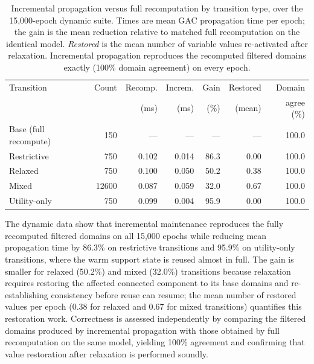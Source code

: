 \documentclass[pdflatex,sn-mathphys-num,iicol,oneside]{sn-jnl}
\begin{document}
\begin{table}[t]
\centering
\caption{Incremental propagation versus full recomputation by
transition type, over the 15{,}000-epoch dynamic suite. Times are mean
GAC propagation time per epoch; the gain is the mean reduction relative
to matched full recomputation on the identical model. \emph{Restored}
is the mean number of variable values re-activated after relaxation.
Incremental propagation reproduces the recomputed filtered domains
exactly (100\% domain agreement) on every epoch.}
\label{tab:incremental-results}
\setlength{\tabcolsep}{4pt}\small
\begin{tabular}{lrrrrrr}
\toprule
Transition & Count & Recomp. & Increm. & Gain & Restored & Domain\\
& & (ms) & (ms) & (\%) & (mean) & agree (\%)\\
\midrule
Base (full recompute) & 150 & --- & --- & --- & --- & 100.0\\
Restrictive & 750 & 0.102 & 0.014 & 86.3 & 0.00 & 100.0\\
Relaxed & 750 & 0.100 & 0.050 & 50.2 & 0.38 & 100.0\\
Mixed & 12600 & 0.087 & 0.059 & 32.0 & 0.67 & 100.0\\
Utility-only & 750 & 0.099 & 0.004 & 95.9 & 0.00 & 100.0\\
\bottomrule
\end{tabular}
\normalsize
\end{table}

The dynamic data show that incremental maintenance reproduces the fully
recomputed filtered domains on all 15{,}000 epochs while reducing mean
propagation time by 86.3\% on restrictive transitions and 95.9\% on
utility-only transitions, where the warm support state is reused almost
in full. The gain is smaller for relaxed (50.2\%) and mixed (32.0\%)
transitions because relaxation requires restoring the affected
connected component to its base domains and re-establishing consistency
before reuse can resume; the mean number of restored values per epoch
(0.38 for relaxed and 0.67 for mixed transitions) quantifies this
restoration work. Correctness is assessed independently by comparing
the filtered domains produced by incremental propagation with those
obtained by full recomputation on the same model, yielding 100\%
agreement and confirming that value restoration after relaxation is
performed soundly.

\end{document}
